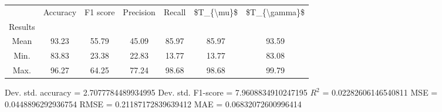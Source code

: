 \begin{tabular}{|c|c|c|c|c|c|c|}
\toprule
{} &  Accuracy &  F1 score &  Precision &  Recall &  \$T\_\{\textbackslash mu\}\$ &  \$T\_\{\textbackslash gamma\}\$ \\
Results &           &           &            &         &            &               \\
\hline
Mean    &     93.23 &     55.79 &      45.09 &   85.97 &      85.97 &         93.59 \\
Min.    &     83.83 &     23.38 &      22.83 &   13.77 &      13.77 &         83.08 \\
Max.    &     96.27 &     64.25 &      77.24 &   98.68 &      98.68 &         99.79 \\
\bottomrule
\end{tabular}

 Dev. std. accuracy = 2.7077784489934995
 Dev. std. F1-score = 7.9608834910247195
 $R^2$ = 0.02282606146540811
 MSE = 0.0448896292936754
 RMSE = 0.21187172839639412
 MAE = 0.06832072600996414